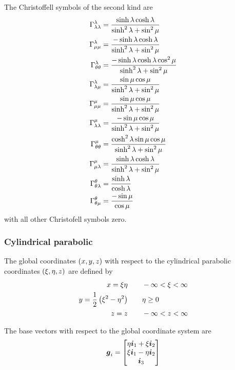 The Christoffell symbols of the second kind are
\begin{align}
   \Gamma^{\lambda}_{\lambda\lambda} &=\frac{\sinh\lambda\cosh\lambda}{\sinh^{2}\lambda+\sin^{2}\mu} \\
   \Gamma^{\lambda}_{\mu\mu} &=\frac{-\sinh\lambda\cosh\lambda}{\sinh^{2}\lambda+\sin^{2}\mu} \\
   \Gamma^{\lambda}_{\theta\theta} &=\frac{-\sinh\lambda\cosh\lambda\cos^{2}\mu}{\sinh^{2}\lambda+\sin^{2}\mu} \\
   \Gamma^{\lambda}_{\lambda\mu} &=\frac{\sin\mu\cos\mu}{\sinh^{2}\lambda+\sin^{2}\mu} \\
   \Gamma^{\mu}_{\mu\mu} &=\frac{\sin\mu\cos\mu}{\sinh^{2}\lambda+\sin^{2}\mu} \\
   \Gamma^{\mu}_{\lambda\lambda} &=\frac{-\sin\mu\cos\mu}{\sinh^{2}\lambda+\sin^{2}\mu} \\
   \Gamma^{\mu}_{\theta\theta} &=\frac{\cosh^{2}\lambda\sin\mu\cos\mu}{\sinh^{2}\lambda+\sin^{2}\mu} \\
   \Gamma^{\mu}_{\mu\lambda} &=\frac{\sinh\lambda\cosh\lambda}{\sinh^{2}\lambda+\sin^{2}\mu} \\
   \Gamma^{\theta}_{\theta\lambda} &=\frac{\sinh\lambda}{\cosh\lambda} \\
   \Gamma^{\theta}_{\theta\mu} &=\frac{-\sin\mu}{\cos\mu} \\
\end{align}
with all other Christofell symbols zero.

\subsubsection{Cylindrical parabolic}

The global coordinates $\left( x,y,z \right)$ with respect to the cylindrical parabolic
coordinates $\left( \xi,\eta,z \right)$  are defined by
\begin{equation}
  \begin{aligned}
    x = \xi\eta & \qquad -\infty < \xi < \infty \\
    y = \frac{1}{2}\left( \xi^{2}-\eta^{2} \right) & \qquad \eta \ge 0 \\
    z =  z & \qquad -\infty < z < \infty
  \end{aligned}
\end{equation}

The base vectors with respect to the global coordinate system are
\begin{equation}
  \vect{g}_{i}=\begin{bmatrix} 
    \eta\vect{i}_{1}+\xi\vect{i}_{2}\\
    \xi\vect{i}_{1}-\eta\vect{i}_{2}\\    
    \vect{i}_{3}
  \end{bmatrix}
\end{equation}

